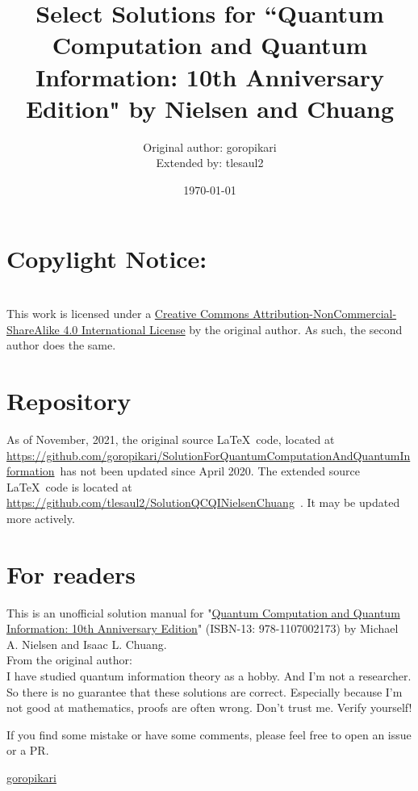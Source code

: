 \documentclass[11pt]{book}
\title{Select Solutions for ``Quantum Computation and Quantum Information: 10th Anniversary Edition" by Nielsen and Chuang}
\author{Original author: goropikari\\Extended by: tlesaul2}
\date{\today}
\begin{document}
\maketitle
\thispagestyle{empty}
\cleardoublepage
\thispagestyle{empty}
\setcounter{page}{1} %

\section*{Copylight Notice:}
\ccbyncsa\\
    This work is licensed under a \href{http://creativecommons.org/licenses/by-nc-sa/4.0/}{Creative Commons Attribution-NonCommercial-ShareAlike 4.0 International License} by the original author.  As such, the second author does the same.


\section*{Repository}
As of November, 2021, the original source \LaTeX \ code, located at \url{https://github.com/goropikari/SolutionForQuantumComputationAndQuantumInformation}\ has not been updated since April 2020.  The extended source \LaTeX \ code is located at \\ \url{https://github.com/tlesaul2/SolutionQCQINielsenChuang}\ .  It may be updated more actively.

\section*{For readers}
This is an unofficial solution manual for "\href{http://www.cambridge.org/jp/academic/subjects/physics/quantum-physics-quantum-information-and-quantum-computation/quantum-computation-and-quantum-information-10th-anniversary-edition?format=HB&isbn=9781107002173#BBFv83H3ofgcgG3A.97}{Quantum Computation and Quantum Information: 10th Anniversary Edition}" (ISBN-13: 978-1107002173) by Michael A. Nielsen and Isaac L. Chuang.\\

\noindent From the original author:\\
\indent I have studied quantum information theory as a hobby.
And I'm not a researcher.
So there is no guarantee that these solutions are correct.
Especially because I'm not good at mathematics, proofs are often wrong.
Don't trust me. Verify yourself!

If you find some mistake or have some comments, please feel free to open an issue or a PR.
\begin{flushright}
\href{https://github.com/goropikari}{goropikari}\\
\end{flushright}
\end{document}

